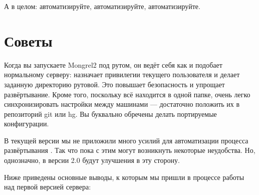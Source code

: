 А в целом: автоматизируйте, автоматизируйте, автоматизируйте.

\section{Советы}

Когда вы запускаете Mongrel2 под рутом, он ведёт себя как и подобает нормальному
серверу: назначает привилегии текущего пользователя и делает заданную директорию
рутовой. Это повышает безопасность и упрощает развёртывание. Кроме того,
поскольку всё находится в одной папке, очень легко синхронизировать настройки
между машинами --- достаточно положить их в репозиторий git или hg. Вы буквально
обречены делать портируемые конфигурации.

В текущей версии мы не приложили много усилий для автоматизации процесса
развёртывания . Так что пока с этим могут
возникнуть некоторые неудобства. Но, однозначно, в версии 2.0 будут улучшения в
эту сторону.

Ниже приведены основные выводы, к которым мы пришли в процессе работы над первой
версией сервера:

